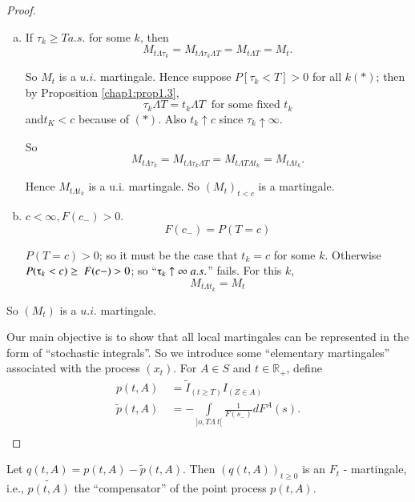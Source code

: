 \begin{proof}%
  \begin{enumerate}[(a)]
  \item  If  $ \tau_k \ge T a.s $. for some  $k$, then 
    $$
    M_{t  \Lambda \tau_k} = M_{t \Lambda \tau _k \Lambda T} = M_{t \Lambda T} = M_t.
    $$

    So $M_t$ is a  $u.i$. martingale. Hence suppose $P[ \tau_k   <
      T] > 0 $ for all $ k (*)$; then by Proposition \ref{chap1:prop1.3}, 
    $$
    \tau_k \Lambda T = t_k  \Lambda T ~  \text{ for some fixed }  t_k
    $$
    and\pageoriginale  $t_K <c $ because of  $(*)$. Also $t_k
    \uparrow c $ since  $\tau_k \uparrow \infty $. 

    So
    $$
    M_{t  \Lambda \tau_k} = M_{ t \Lambda \tau_k \Lambda T} =  M_{t
      \Lambda T \Lambda t_k}  =  M_{ t \Lambda t_k}. 
    $$ 

    Hence $M_{t \Lambda t_k }$ is a u.i. martingale. So $ (M_t)_{t
      < c } $  is a  martingale.  

  \item $ c  < \infty,  F ( c_- )  > 0 $.
  $$
  F(c_-) = P( T = c )
  $$

  $P (T = c) >  0 $; so it must be the case that  $ t_k = c $ for
  some $k$. Otherwise  $ P (\tauup_k < c ) \ge ~  F (c- ) > 0 $; so
  ``$\tauup _k \uparrow \infty \; a.s.$'' fails. For this  $k$,  
  $$
  M_{t \Lambda t_k } =  M_t
  $$
  \end{enumerate}
So $(M_t)$ is  a $ u.i $. martingale. 

Our main objective is to show  that  all local martingales can be
represented  in the form of  ``stochastic  integrals''. So we
introduce some ``elementary martingales''  associated with the
process $(x_t) $. For $ A \in  S $ and  $ t  \in 
\mathbb{R}_+ $, define 
\begin{align*}
  p ( t,A ) ~ &= \tilde{I}_{(t \ge T)} I_{( Z \in  A )} \\
  \tilde{p} ( t,A ) ~ &= -\int\limits_{ ]o,T \Lambda  ~t[} \frac{1}{F
    (s_- )} dF^A (s).\\ 
\end{align*}
\end{proof}

\begin{prop}\label{chap1:prop1.5}%
  Let $ q (t,A)    = p(t,A)-\tilde{p} (t,A) $. Then $ (q (t,A))
  _{t \ge 0 } $  is an $ F_t $  - martingale,  i.e., $ \tilde{p (t,A)}
  $  the ``compensator'' of the point process $ p (t,A) $. 
\end{prop}

